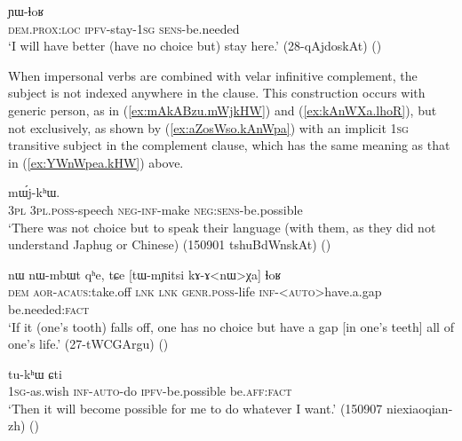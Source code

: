 \begin{exe} 
\ex \label{ex:kurAZia.YWlhoR}
 ɲɯ-ɬoʁ \\
\textsc{dem}.\textsc{prox}:\textsc{loc} \textsc{ipfv}-stay-\textsc{1sg} \textsc{sens}-be.needed \\
\glt `I will have better (have no choice but) stay here.' (28-qAjdoskAt)
()
\end{exe} 

When impersonal verbs are combined with velar infinitive complement, the subject is not indexed anywhere in the clause. This construction occurs with generic person, as in (\ref{ex:mAkABzu.mWjkHW}) and (\ref{ex:kAnWXa.lhoR}), but not exclusively, as shown by (\ref{ex:aZosWso.kAnWpa}) with an implicit \textsc{1sg} transitive subject in the complement clause, which has the same meaning as that in (\ref{ex:YWnWpea.kHW}) above.

\begin{exe} 
\ex \label{ex:mAkABzu.mWjkHW}
 mɯ́j-kʰɯ. \\
\textsc{3pl} \textsc{3pl}.\textsc{poss}-speech \textsc{neg}-\textsc{inf}-make \textsc{neg}:\textsc{sens}-be.possible \\
\glt `There was not choice but to speak their language (with them, as they did not understand Japhug or Chinese) (150901 tshuBdWnskAt)
()
\end{exe} 

\begin{exe} 
\ex \label{ex:kAnWXa.lhoR}
\gll  nɯ nɯ-mbɯt qʰe, tɕe [tɯ-mɲitsi kɤ-ɤ<nɯ>χa] ɬoʁ \\
\textsc{dem} \textsc{aor}-\textsc{acaus}:take.off \textsc{lnk} \textsc{lnk} \textsc{genr}.\textsc{poss}-life \textsc{inf}-<\textsc{auto}>have.a.gap be.needed:\textsc{fact} \\
\glt `If it (one's tooth) falls off, one has no choice but have a gap [in one's teeth] all of one's life.' (27-tWCGArgu)
()
\end{exe} 

\begin{exe} 
\ex \label{ex:aZosWso.kAnWpa}
 tu-kʰɯ ɕti \\
\textsc{1sg}-as.wish \textsc{inf}-\textsc{auto}-do \textsc{ipfv}-be.possible be.\textsc{aff}:\textsc{fact} \\
\glt `Then it will become possible for me to do whatever I want.' (150907 niexiaoqian-zh)
()
\end{exe} 



